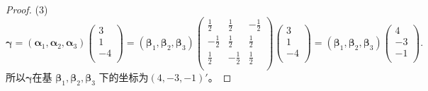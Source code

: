 \begin{enumerate}[1~]
\begin{proof}
(3) \[
\boldsymbol{\boldsymbol{\gamma}}=\left( \boldsymbol { \boldsymbol{\alpha} } _1,\boldsymbol { \boldsymbol{\alpha} } _2,\boldsymbol { \boldsymbol{\alpha} } _3 \right) \left( \begin{array}{c}
	3\\
	1\\
	-4\\
\end{array} \right) =\left( \boldsymbol { \boldsymbol{\beta} }_1, \boldsymbol { \boldsymbol{\beta} }_2, \boldsymbol { \boldsymbol{\beta} }_3 \right) \left( \begin{matrix}
	\frac{1}{2}&		\frac{1}{2}&		-\frac{1}{2}\\
	-\frac{1}{2}&		\frac{1}{2}&		\frac{1}{2}\\
	\frac{1}{2}&		-\frac{1}{2}&		\frac{1}{2}\\
\end{matrix} \right) \left( \begin{array}{c}
	3\\
	1\\
	-4\\
\end{array} \right) =\left( \boldsymbol { \boldsymbol{\beta} }_1, \boldsymbol { \boldsymbol{\beta} }_2, \boldsymbol { \boldsymbol{\beta} }_3 \right) \left( \begin{array}{c}
	4\\
	-3\\
	-1\\
\end{array} \right) .
\]
所以$\boldsymbol{\boldsymbol{\gamma}}$在基 $\boldsymbol { \boldsymbol{\beta} }_1, \boldsymbol { \boldsymbol{\beta} }_2, \boldsymbol { \boldsymbol{\beta} }_3$ 下的坐标为$(4, -3, -1)'$。
\end{proof}


\end{enumerate}
